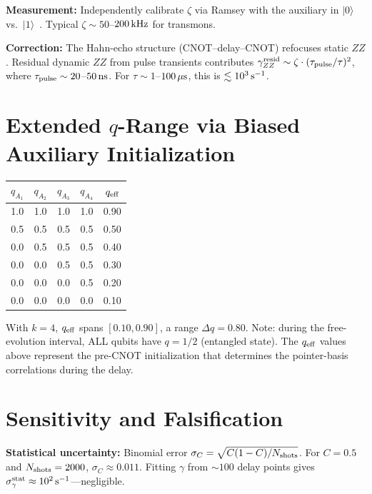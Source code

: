 \documentclass[aps,prl,twocolumn]{revtex4-2}
\begin{document}
\textbf{Measurement:} Independently calibrate $\zeta$ via Ramsey with the auxiliary in $|0\rangle$ vs.\ $|1\rangle$~\cite{Krantz:2019}. Typical $\zeta \sim 50$--$200\,{\rm kHz}$ for transmons.

\textbf{Correction:} The Hahn-echo structure (CNOT--delay--CNOT) refocuses static $ZZ$. Residual dynamic $ZZ$ from pulse transients contributes $\gamma_{ZZ}^{\rm resid} \sim \zeta \cdot (\tau_{\rm pulse}/\tau)^2$, where $\tau_{\rm pulse} \sim 20$--$50\,{\rm ns}$. For $\tau \sim 1$--$100\,\mu{\rm s}$, this is $\lesssim 10^3\,{\rm s}^{-1}$.

\section{Extended $q$-Range via Biased Auxiliary Initialization}

\begin{center}
\begin{tabular}{ccccc}
\toprule
$q_{A_1}$ & $q_{A_2}$ & $q_{A_3}$ & $q_{A_4}$ & $q_{\rm eff}$ \\
\midrule
1.0 & 1.0 & 1.0 & 1.0 & 0.90 \\
0.5 & 0.5 & 0.5 & 0.5 & 0.50 \\
0.0 & 0.5 & 0.5 & 0.5 & 0.40 \\
0.0 & 0.0 & 0.5 & 0.5 & 0.30 \\
0.0 & 0.0 & 0.0 & 0.5 & 0.20 \\
0.0 & 0.0 & 0.0 & 0.0 & 0.10 \\
\bottomrule
\end{tabular}
\end{center}

With $k=4$, $q_{\rm eff}$ spans $[0.10, 0.90]$, a range $\Delta q = 0.80$. Note: during the free-evolution interval, ALL qubits have $q=1/2$ (entangled state). The $q_{\rm eff}$ values above represent the pre-CNOT initialization that determines the pointer-basis correlations during the delay.

\section{Sensitivity and Falsification}

\textbf{Statistical uncertainty:} Binomial error $\sigma_C = \sqrt{C(1-C)/N_{\rm shots}}$. For $C=0.5$ and $N_{\rm shots}=2000$, $\sigma_C \approx 0.011$. Fitting $\gamma$ from $\sim 100$ delay points gives $\sigma_\gamma^{\rm stat} \approx 10^2\,{\rm s}^{-1}$---negligible.
\end{document}
